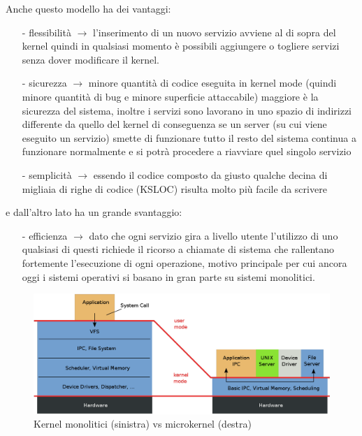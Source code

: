 Anche questo modello ha dei vantaggi:
\begin{itemize}
	\item[-] flessibilità $\rightarrow$ l'inserimento di un nuovo servizio avviene al di sopra del kernel quindi in qualsiasi momento è possibili aggiungere o togliere servizi senza dover modificare il kernel.
	\item[-] sicurezza $\rightarrow$ minore quantità di codice eseguita in kernel mode (quindi minore quantità di bug e minore superficie attaccabile) maggiore è la sicurezza del sistema, inoltre i servizi sono lavorano in uno spazio di indirizzi differente da quello del kernel di conseguenza se un server (su cui viene eseguito un servizio) smette di funzionare tutto il resto del sistema continua a funzionare normalmente e si potrà procedere a riavviare quel singolo servizio
	\item[-] semplicità $\rightarrow$ essendo il codice composto da giusto qualche decina di migliaia di righe di codice (KSLOC) risulta molto più facile da scrivere
\end{itemize}
e dall'altro lato ha un grande svantaggio:
\begin{itemize}
	\item[-] efficienza $\rightarrow$ dato che ogni servizio gira a livello utente l'utilizzo di uno qualsiasi di questi richiede il ricorso a chiamate di sistema che rallentano fortemente l'esecuzione di ogni operazione, motivo principale per cui ancora oggi i sistemi operativi si basano in gran parte su sistemi monolitici.
\end{itemize}

\begin{figure}[h]
  \includegraphics[width=\linewidth]{img/MonolithicVSmicrokernel.png}
  \caption{Kernel monolitici (sinistra) vs microkernel (destra)}
  \label{fig:MonolithicVSmicrokernel}
\end{figure}

